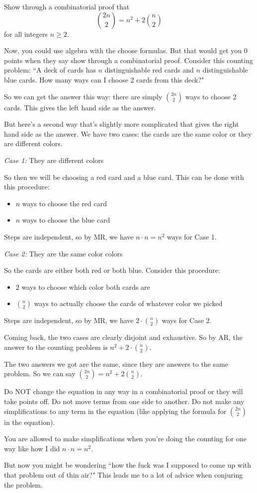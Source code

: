 \documentclass[11pt]{scrartcl}
\begin{document}
\begin{example}
Show through a combinatorial proof that \[\binom{2n}{2} = n^2 + 2\binom{n}{2}\] for all integers $n \geq 2$.
\end{example}
Now, you could use algebra with the choose formulas. But that would get you 0 points when they say show through a combinatorial proof. Consider this counting problem: ``A deck of cards has $n$ distinguishable red cards and $n$ distinguishable blue cards. How many ways can I choose 2 cards from this deck?"

So we can get the answer this way: there are simply $\binom{2n}{2}$ ways to choose 2 cards. This gives the left hand side as the answer.

But here's a second way that's slightly more complicated that gives the right hand side as the answer. We have two cases: the cards are the same color or they are different colors.

\noindent
\textit{Case 1:} They are different colors

So then we will be choosing a red card and a blue card. This can be done with this procedure:
\begin{itemize}
    \item $n$ ways to choose the red card
    \item $n$ ways to choose the blue card
\end{itemize}
Steps are independent, so by MR, we have $n \cdot n = n^2$ ways for Case 1.

\noindent
\textit{Case 2:} They are the same color colors

So the cards are either both red or both blue. Consider this procedure:
\begin{itemize}
    \item $2$ ways to choose which color both cards are
    \item $\binom{n}{2}$ ways to actually choose the cards of whatever color we picked
\end{itemize}
Steps are independent, so by MR, we have $2 \cdot \binom{n}{2}$ ways for Case 2.

Coming back, the two cases are clearly disjoint and exhaustive. So by AR, the answer to the counting problem is $n^2 + 2 \cdot \binom{n}{2}$.

The two answers we got are the same, since they are answers to the same problem. So we can say $\binom{2n}{2} = n^2 + 2\binom{n}{2}$.

\begin{caveat}
    Do NOT change the equation in any way in a combinatorial proof or they will take points off. Do not move terms from one side to another. Do not make any simplifications to any term in the equation (like applying the formula for $\binom{2n}{2}$ in the equation).

    You are allowed to make simplifications when you're doing the counting for one way like how I did $n \cdot n = n^2$.
\end{caveat}
But now you might be wondering ``how the fuck was I supposed to come up with that problem out of thin air?" This leads me to a lot of advice when conjuring the problem.
\end{document}
